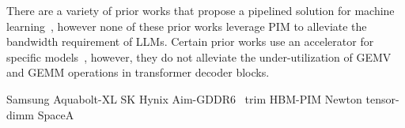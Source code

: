 %
There are a variety of prior works that propose a pipelined solution for machine learning~\cite{fae, dnnweaver:micro, cosmic:micro, dana}, however none of these prior works leverage PIM to alleviate the bandwidth requirement of LLMs.
%
Certain prior works use an accelerator for specific models~\cite{hotline, scratchpipe, tabla:hpca}, however, they do not alleviate the under-utilization of GEMV and GEMM operations in transformer decoder blocks.

%

%
Samsung Aquabolt-XL\cite{hcs23-aquabolt-xl}
SK Hynix Aim-GDDR6~\cite{isscc22-aim-gddr6}
trim\cite{micro21-trim}
HBM-PIM \cite{hbm_pim}
Newton \cite{newton}
tensor-dimm \cite{tensor-dimm}
SpaceA\cite{SpaceA}
%
\fi 